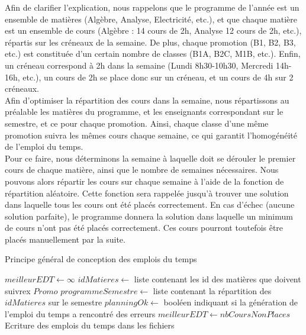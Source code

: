 Afin de clarifier l'explication, nous rappelons que le programme de l'année est un ensemble de matières (Algèbre, Analyse, Electricité, etc.), et que chaque matière est un ensemble de cours (Algèbre : 14 cours de 2h, Analyse 12 cours de 2h, etc.), répartis sur les créneaux de la semaine. De plus, chaque promotion (B1, B2, B3, etc.) est constituée d'un certain nombre de classes (B1A, B2C, M1B, etc.).
Enfin, un créneau correspond à 2h dans la semaine (Lundi 8h30-10h30, Mercredi 14h-16h, etc.), un cours de 2h se place donc sur un créneau, et un cours de 4h sur 2 créneaux.\\

Afin d'optimiser la répartition des cours dans la semaine, nous répartissons au préalable les matières du programme, et les enseignants correspondant sur le semestre, et ce pour chaque promotion. Ainsi, chaque classe d'une même promotion suivra les mêmes cours chaque semaine, ce qui garantit l'homogénéité de l'emploi du temps.\\

Pour ce faire, nous déterminons la semaine à laquelle doit se dérouler le premier cours de chaque matière, ainsi que le nombre de semaines nécessaires. Nous pouvons alors répartir les cours sur chaque semaine à l'aide de la fonction de répartition aléatoire. Cette fonction sera rappelée jusqu'à trouver une solution dans laquelle tous les cours ont été placés correctement. En cas d'échec (aucune solution parfaite), le programme donnera la solution dans laquelle un minimum de cours n'ont pas été placés correctement. Ces cours pourront toutefois être placés manuellement par la suite.\\

\newpage

\begin{algorithm}
\caption{Principe général de conception des emplois du temps}
\begin{algorithmic}
\STATE $meilleurEDT \leftarrow \infty$
\REPEAT
{}
\STATE $idMatieres \leftarrow$ liste contenant les id des matières que doivent suivrex $Promo$
\STATE $programmeSemestre \leftarrow $ liste contenant la répartition des $idMatieres$ sur le semestre
\STATE $planningOk \leftarrow$ booléen indiquant si la génération de l'emploi du temps a rencontré des erreurs
\ENDFOR
{}
\STATE $meilleurEDT \leftarrow nbCoursNonPlaces$
\STATE Ecriture des emplois du temps dans les fichiers
\ENDIF
\ENDIF
{}
\end{algorithmic}
\end{algorithm}

